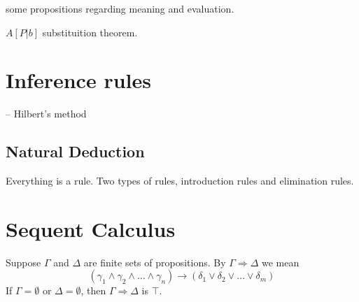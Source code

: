 some propositions regarding meaning and evaluation.

\(A[P|b]\)
 substituition  theorem.
 \section{Inference rules}
 -- Hilbert's method
 \subsection{Natural Deduction}
 Everything is a rule. Two types of rules, introduction rules and elimination rules.


\section{Sequent Calculus}
Suppose \(\Gamma\) and \(\Delta\) are finite sets of propositions. By \(\Gamma \Rightarrow \Delta\) we mean 
\begin{equation}
   ( \gamma_1 \land \gamma_2 \land \dots \land \gamma_n) \to (\delta_1 \lor \delta_2 \lor \dots \lor \delta_m)
\end{equation}
If \(\Gamma = \emptyset\) or \(\Delta = \emptyset\), then \(\Gamma \Rightarrow \Delta\) is \(\top\).

